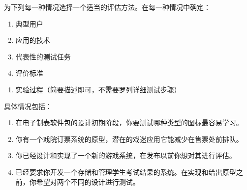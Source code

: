 \begin{problem}[2013、2015、2022]
为下列每一种情况选择一个适当的评估方法。在每一种情况中确定：
\vspace{-0.8em}
\begin{multicols}{4}
    \begin{enumerate}[label=\arabic*.]
        \item 典型用户
        \item 应用的技术
        \item 代表性的测试任务
        \item 评价标准
    \end{enumerate}
\end{multicols}
\vspace{-1em}
\begin{enumerate}[label=\arabic*.,start=5]
    \item 实验过程（简要描述即可，不需要罗列详细测试步骤）
\end{enumerate}

具体情况包括：
\begin{enumerate}[label=\alph*.]
    \item 在电子制表软件包的设计初期阶段，你要测试哪种类型的图标最容易学习。
    \item 你有一个戏院订票系统的原型，潜在的戏迷应用它能减少在售票处前排队。
    \item 你已经设计和实现了一个新的游戏系统，在发布以前你想对其进行评估。
    \item 已经要求你开发一个存储和管理学生考试结果的系统。在实现和给出原型之前，你希望对两个不同的设计进行测试。
\end{enumerate}
\end{problem}

